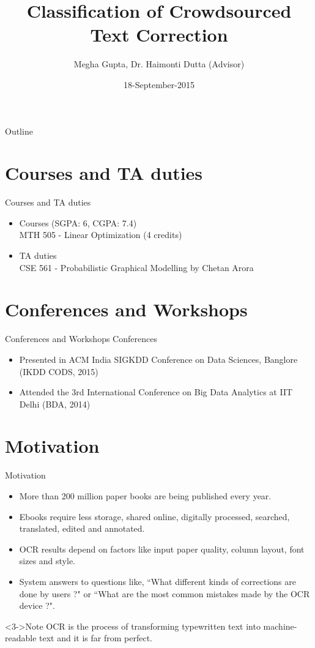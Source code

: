 \documentclass{beamer}
\title[CCTC]{Classification of Crowdsourced Text Correction}
\author{Megha Gupta,
Dr. Haimonti Dutta (Advisor)}
\institute{Second Year Annual Presentation, 2013-2014 \\
IIIT Delhi}
\date{18-September-2015}
\begin{document}
\begin{frame}
  \titlepage
\end{frame}

\begin{frame}{Outline}
  \tableofcontents
\end{frame}

\section{Courses and TA duties}
\begin{frame}{Courses and TA duties}
\begin{itemize}
\item Courses (SGPA: 6, CGPA: 7.4) \\
MTH 505 - Linear Optimization (4 credits)
\item TA duties \\
CSE 561 - Probabilistic Graphical Modelling by Chetan Arora
\end{itemize}
\end{frame}

\section{Conferences and Workshops}
\begin{frame}{Conferences and Workshops}
Conferences
\begin{itemize}
\item Presented in ACM India SIGKDD Conference on Data Sciences, Banglore (IKDD CODS, 2015)
\item Attended the 3rd International Conference on Big Data Analytics at IIT Delhi (BDA, 2014)
\end{itemize}
\end{frame}


\section{Motivation}
\begin{frame}{Motivation}
\begin{itemize}
\item<1-> More than 200 million paper books are being published every year.
\item<2-> Ebooks require less storage, shared online, digitally processed, searched, translated, edited and annotated.
\item<3-> OCR results depend on factors like input paper quality, column layout, font sizes and style.
\item<4-> System answers to questions like, ``What different kinds of corrections are done by users ?" or ``What are the most common mistakes made by the OCR device ?".
\end{itemize}
\begin{block}<3->{Note}
OCR is the process of transforming typewritten text into machine-readable text and it is far from perfect.
\end{block}
\end{frame}
\end{document}
